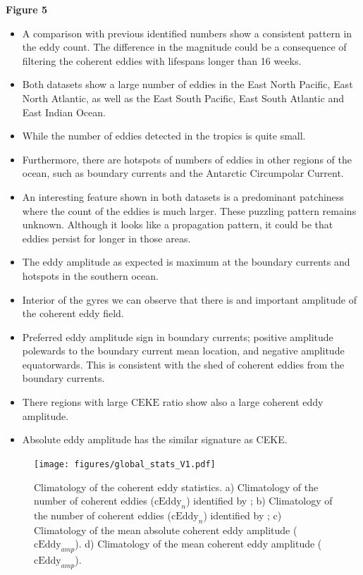 \documentclass[draft,linenumbers]{agujournal2019}
\newcommand{\CEKE}{\textrm{CEKE}}
\newcommand{\cEddy}{\textrm{cEddy}}
\begin{document}
	\textbf{Figure 5}
	\begin{itemize}
		\item A comparison with previous identified numbers show a consistent pattern in the eddy count. The difference in the magnitude could be a consequence of \citet{Chelton_Global_2007} filtering the coherent eddies with lifespans longer than 16 weeks. 
		\item Both datasets show a large number of eddies in the East North Pacific, East North Atlantic, as well as the East South Pacific, East South Atlantic and East Indian Ocean. 
		\item While the number of eddies detected in the tropics is quite small.
		\item Furthermore, there are hotspots of numbers of eddies in other regions of the ocean, such as boundary currents and the Antarctic Circumpolar Current. 
		\item An interesting feature shown in both datasets is a predominant patchiness where the count of the eddies is much larger. These puzzling pattern remains unknown. Although it looks like a propagation pattern, it could be that eddies persist for longer in those areas.
		\item The eddy amplitude as expected is maximum at the boundary currents and hotspots in the southern ocean.
		\item Interior of the gyres we can observe that there is and important amplitude of the coherent eddy field. 
		\item Preferred eddy amplitude sign in boundary currents; positive amplitude polewards to the boundary current mean location, and negative amplitude equatorwards. This is consistent with the shed of coherent eddies from the boundary currents.
		\item There regions with large $\CEKE$ ratio show also a large coherent eddy amplitude.
		\item Absolute eddy amplitude has the similar signature as CEKE.
	\end{itemize}

	\begin{figure}
	    \centering
	    \texttt{[image: figures/global\_stats\_V1.pdf]}
	    \caption{Climatology of the coherent eddy statistics. a) Climatology of the number of coherent eddies ($\cEddy_n$) identified by \citet{Chelton_Global_2007};  b) Climatology of the number of coherent eddies ($\cEddy_n$) identified by \citet{Martinez_TKE_2019}; c) Climatology of the mean absolute coherent eddy amplitude ($\cEddy_{amp}$). d) Climatology of the mean coherent eddy amplitude ($\cEddy_{amp}$).}
	    \label{fig:eddy_stats_climatology}
	\end{figure}
\end{document}
